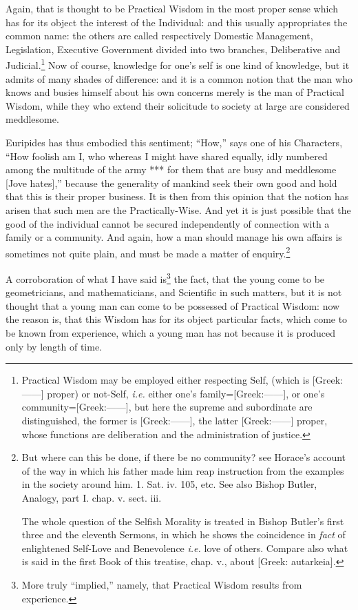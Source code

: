 Again, that is thought to be Practical Wisdom in the most proper sense which
has for its object the interest of the Individual: and this usually
appropriates the common name: the others are called respectively Domestic
Management, Legislation, Executive Government divided into two branches,
Deliberative and Judicial.\footnote{Practical Wisdom may be employed either respecting Self, (which is
[Greek:——] proper) or not-Self, \emph{i.e.} either one’s
family=[Greek:——], or one’s community=[Greek:——],
but here the supreme and subordinate are distinguished, the former is
[Greek:——], the latter [Greek:——] proper, whose
functions are deliberation and the administration of justice.}
Now of course, knowledge for one’s self is one kind of knowledge, but it
admits of many shades of difference: and it is a common notion that the man who
knows and busies himself about his own concerns merely is the man of Practical
Wisdom, while they who extend their solicitude to society at large are
considered meddlesome.

Euripides has thus embodied this sentiment; “How,” says one of his
Characters, “How foolish am I, who whereas I might have shared equally,
idly numbered among the multitude of the army *** for them that are busy and
meddlesome [Jove hates],” because the generality of mankind seek their
own good and hold that this is their proper business. It is then from this
opinion that the notion has arisen that such men are the Practically-Wise. And
yet it is just possible that the good of the individual cannot be secured
independently of connection with a family or a community. And again, how a man
should manage his own affairs is sometimes not quite plain, and must be made a
matter of enquiry.\footnote{But where can this be done, if there be no community? see Horace’s
account of the way in which his father made him reap instruction from the
examples in the society around him. 1. Sat. iv. 105, etc. See also Bishop
Butler, Analogy, part I. chap. v. sect. iii.

The whole question of the Selfish Morality is treated in Bishop
Butler’s first three and the eleventh Sermons, in which he shows the
coincidence in \emph{fact} of enlightened Self-Love and Benevolence \emph{i.e.}
love of others. Compare also what is said in the first Book of this treatise,
chap. v., about [Greek: autarkeia].}

A corroboration of what I have said is\footnote{More truly “implied,” namely, that Practical Wisdom results from
experience.}
the fact, that the young come to be geometricians, and mathematicians, and
Scientific in such matters, but it is not thought that a young man can come to
be possessed of Practical Wisdom: now the reason is, that this Wisdom has for
its object particular facts, which come to be known from experience, which a
young man has not because it is produced only by length of time.

